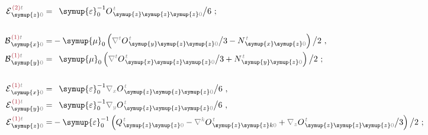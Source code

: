 \begin{subequations} \label{eq:EB^(2-0)_0=}
\begin{align}
	{\mathcal{E}}^{\;\!\textcolor{Maroon}{(2)}\mathcolor{gray}{t}}_{\;\! \symup{z} \mathcolor{gray}{0}} = &\hphantom{+} {\symup{\varepsilon}}_0^{-1} O^{\;\!\mathcolor{gray}{t}}_{\;\! \symup{z}\symup{z}\symup{z}\mathcolor{gray}{0}} \big/ 6~; \label{eq:E^(2)_z0=} \\[1.5em]
	{\mathcal{B}}^{\;\!\textcolor{Maroon}{(1)}\mathcolor{gray}{t}}_{\;\! \symup{x} \mathcolor{gray}{0}} = &- {\symup{\mu}}_0 \left( \mathcolor{gray}{\nabla^t}
	O^{\;\!\mathcolor{gray}{t}}_{\;\!\symup{y}\symup{z}\symup{z}\mathcolor{gray}{0}} \big/ 3 - N^{\;\!\mathcolor{gray}{t}}_{\;\!\symup{x}\symup{z}\mathcolor{gray}{0}} \right) \big/ 2~, \label{eq:B^(1)_x0=} \\
	{\mathcal{B}}^{\;\!\textcolor{Maroon}{(1)}\mathcolor{gray}{t}}_{\;\! \symup{y} \mathcolor{gray}{0}} = &\hphantom{+} {\symup{\mu}}_0 \left( \mathcolor{gray}{\nabla^t}
	O^{\;\!\mathcolor{gray}{t}}_{\;\!\symup{x}\symup{z}\symup{z}\mathcolor{gray}{0}} \big/ 3 + N^{\;\!\mathcolor{gray}{t}}_{\;\!\symup{y}\symup{z}\mathcolor{gray}{0}} \right) \big/ 2~; \label{eq:B^(1)_y0=} \\[1.5em]
	{\mathcal{E}}^{\;\!\textcolor{Maroon}{(1)}\mathcolor{gray}{t}}_{\;\! \symup{x} \mathcolor{gray}{0}} = &\hphantom{+} {\symup{\varepsilon}}_0^{-1} \mathcolor{gray}{\nabla_x} O^{\;\!\mathcolor{gray}{t}}_{\;\! \symup{z}\symup{z}\symup{z}\mathcolor{gray}{0}} \big/ 6~, \label{eq:E^(1)_x0=} \\
	{\mathcal{E}}^{\;\!\textcolor{Maroon}{(1)}\mathcolor{gray}{t}}_{\;\! \symup{y} \mathcolor{gray}{0}} = &\hphantom{+} {\symup{\varepsilon}}_0^{-1} \mathcolor{gray}{\nabla_y} O^{\;\!\mathcolor{gray}{t}}_{\;\! \symup{z}\symup{z}\symup{z}\mathcolor{gray}{0}} \big/ 6~, \label{eq:E^(1)_y0=} \\
	{\mathcal{E}}^{\;\!\textcolor{Maroon}{(1)}\mathcolor{gray}{t}}_{\;\! \symup{z} \mathcolor{gray}{0}} = &- {\symup{\varepsilon}}_0^{-1} \left( Q^{\;\!\mathcolor{gray}{t}}_{\;\! \symup{z} \symup{z} \mathcolor{gray}{0}} - \mathcolor{gray}{\nabla^k} O^{\;\!\mathcolor{gray}{t}}_{\;\! \symup{z} \symup{z} k \mathcolor{gray}{0}} + \mathcolor{gray}{\nabla_z} O^{\;\!\mathcolor{gray}{t}}_{\;\! \symup{z} \symup{z} \symup{z} \mathcolor{gray}{0}} \big/ 3 \right) \big/ 2~; \label{eq:E^(1)_z0=} \\[1.5em]

\end{align}
\end{subequations}
